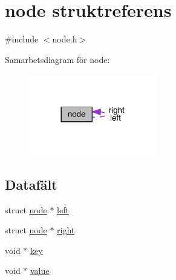 \hypertarget{structnode}{\section{node struktreferens}
\label{structnode}
}


{\ttfamily \#include $<$node.\+h$>$}



Samarbetsdiagram för node\+:
\nopagebreak
\begin{figure}[H]
\begin{center}
\leavevmode
\includegraphics[width=158pt]{structnode__coll__graph}
\end{center}
\end{figure}
\subsection*{Datafält}
\begin{DoxyCompactItemize}
\item 
struct \hyperlink{structnode}{node} $\ast$ \hyperlink{structnode_a3ce38490a651bfda86d88ff955e96abc}{left}
\item 
struct \hyperlink{structnode}{node} $\ast$ \hyperlink{structnode_a875f75abfe22103500535b179828e4e3}{right}
\item 
void $\ast$ \hyperlink{structnode_a72c8a0c41b801c92db89c5078642f28b}{key}
\item 
void $\ast$ \hyperlink{structnode_a288a44aecd04d7839824d50a0b65982e}{value}
\end{DoxyCompactItemize}


